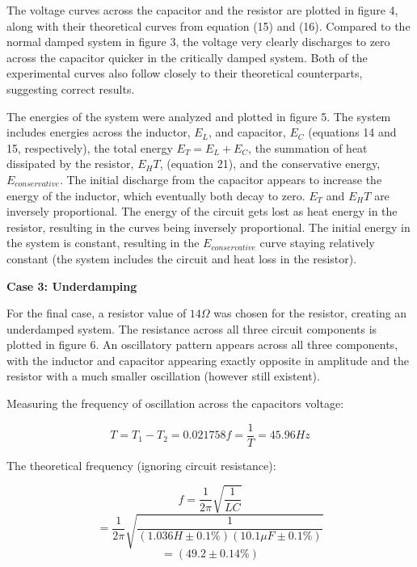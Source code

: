 \documentclass[twocolumn, letterpaper, 10pt, twoside]{article}
\begin{document}
	The voltage curves across the capacitor and the resistor are plotted in figure 4, along with their theoretical curves from equation (15) and (16). Compared to the normal damped system in figure 3, the voltage very clearly discharges to zero across the capacitor quicker in the critically damped system. Both of the experimental curves also follow closely to their theoretical counterparts, suggesting correct results. 
	
	The energies of the system were analyzed and plotted in figure 5. The system includes energies across the inductor, $E_L$, and capacitor, $E_C$ (equations 14 and 15, respectively), the total energy $E_T = E_L + E_C$, the summation of heat dissipated by the resistor, $E_HT$, (equation 21), and the conservative energy, $E_{conservative}$. The initial discharge from the capacitor appears to increase the energy of the inductor, which eventually both decay to zero. $E_T$ and $E_HT$ are inversely proportional. The energy of the circuit gets lost as heat energy in the resistor, resulting in the curves being inversely proportional. The initial energy in the system is constant, resulting in the $E_{conservative}$ curve staying relatively constant (the system includes the circuit and heat loss in the resistor). 
	
			
	\textbf{{Case 3:} Underdamping}
	
	For the final case, a resistor value of $14\Omega$ was chosen for the resistor, creating an underdamped system. The resistance across all three circuit components is plotted in figure 6. An oscillatory pattern appears across all three components, with the inductor and capacitor appearing exactly opposite in amplitude and the resistor with a much smaller oscillation (however still existent). 
	
	Measuring the frequency of oscillation across the capacitors voltage:
	
	\begin{equation*}
	T =  T_1 - T_2 = 0.021758
	f = \frac{1}{T} = 45.96 Hz
	\end{equation*}
	
	The theoretical frequency (ignoring circuit resistance):
	
	\begin{equation*}
	f = \frac{1}{2\pi}\sqrt{\frac{1}{LC}}
	\end{equation*}
	\begin{equation*}
	= \frac{1}{2\pi}\sqrt{\frac{1}{(1.036H \pm 0.1\%)(10.1\mu F \pm 0.1\%)}} 
	\end{equation*}
	\begin{equation*}
	= (49.2 \pm 0.14\%)
	\end{equation*}
	
\end{document}

